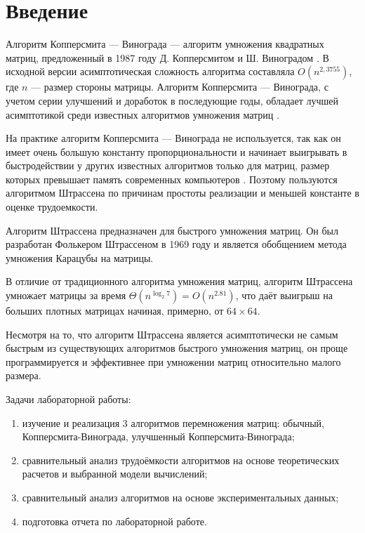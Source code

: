 \chapter*{Введение}

Алгоритм Копперсмита — Винограда — алгоритм умножения квадратных матриц, предложенный в 1987 году Д. Копперсмитом и Ш. Виноградом \cite{Coppersmith}.
В исходной версии асимптотическая сложность алгоритма составляла $O(n^{2,3755})$, где  $n$ — размер стороны матрицы.
Алгоритм Копперсмита — Винограда, с учетом серии улучшений и доработок в последующие годы, обладает лучшей асимптотикой среди известных алгоритмов умножения матриц \cite{Cohn}.

На практике алгоритм Копперсмита — Винограда не используется, так как он имеет очень большую константу пропорциональности и начинает выигрывать в быстродействии у других известных алгоритмов только для матриц, размер которых превышает память современных компьютеров \cite{Robinson}.
Поэтому пользуются алгоритмом Штрассена по причинам простоты реализации и меньшей константе в оценке трудоемкости.

Алгоритм Штрассена \cite{Strassen} предназначен для быстрого умножения матриц.
Он был разработан Фолькером Штрассеном в 1969 году и является обобщением метода умножения Карацубы на матрицы.

В отличие от традиционного алгоритма умножения матриц, алгоритм Штрассена умножает матрицы за время ${\displaystyle \Theta (n^{\log _{2}7})=O(n^{2.81})}$, что даёт выигрыш на больших плотных матрицах начиная, примерно, от $64\times64$.

Несмотря на то, что алгоритм Штрассена является асимптотически не самым быстрым из существующих алгоритмов быстрого умножения матриц, он проще программируется и эффективнее при умножении матриц относительно малого размера.

Задачи лабораторной работы:

\begin{enumerate}
	\item изучение и реализация 3 алгоритмов перемножения матриц: обычный, Копперсмита-Винограда, улучшенный Копперсмита-Винограда;
	\item сравнительный анализ трудоёмкости алгоритмов на основе теоретических расчетов и выбранной модели вычислений;
	\item сравнительный анализ алгоритмов на основе экспериментальных данных;
    \item подготовка отчета по лабораторной работе.
\end{enumerate}

